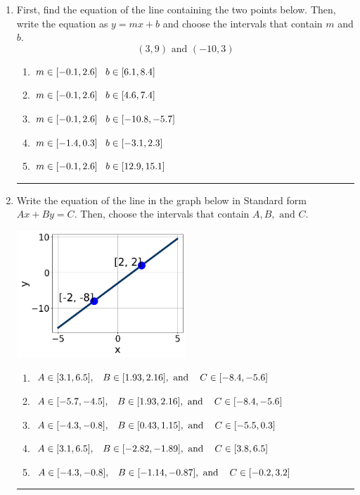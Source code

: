 \documentclass[14pt]{extbook}
\newcommand{\litem}[1]{\item#1\hspace*{-1cm}\rule{\textwidth}{0.4pt}}
\begin{document}
\begin{enumerate}
{\begin{enumerate}[label=\Alph*.]
\end{enumerate} }
\litem{
First, find the equation of the line containing the two points below. Then, write the equation as $ y=mx+b $ and choose the intervals that contain $m$ and $b$.\[ (3, 9) \text{ and } (-10, 3) \]\begin{enumerate}[label=\Alph*.]
\item \( m \in [-0.1, 2.6] \hspace*{3mm} b \in [6.1, 8.4] \)
\item \( m \in [-0.1, 2.6] \hspace*{3mm} b \in [4.6, 7.4] \)
\item \( m \in [-0.1, 2.6] \hspace*{3mm} b \in [-10.8, -5.7] \)
\item \( m \in [-1.4, 0.3] \hspace*{3mm} b \in [-3.1, 2.3] \)
\item \( m \in [-0.1, 2.6] \hspace*{3mm} b \in [12.9, 15.1] \)

\end{enumerate} }
\litem{
Write the equation of the line in the graph below in Standard form $Ax+By=C$. Then, choose the intervals that contain $A, B, \text{ and } C$.
\begin{center}
    \includegraphics[width=0.5\textwidth]{../Figures/linearGraphToStandardCopyA.png}
\end{center}
\begin{enumerate}[label=\Alph*.]
\item \( A \in [3.1, 6.5], \hspace{3mm} B \in [1.93, 2.16], \text{ and } \hspace{3mm} C \in [-8.4, -5.6] \)
\item \( A \in [-5.7, -4.5], \hspace{3mm} B \in [1.93, 2.16], \text{ and } \hspace{3mm} C \in [-8.4, -5.6] \)
\item \( A \in [-4.3, -0.8], \hspace{3mm} B \in [0.43, 1.15], \text{ and } \hspace{3mm} C \in [-5.5, 0.3] \)
\item \( A \in [3.1, 6.5], \hspace{3mm} B \in [-2.82, -1.89], \text{ and } \hspace{3mm} C \in [3.8, 6.5] \)
\item \( A \in [-4.3, -0.8], \hspace{3mm} B \in [-1.14, -0.87], \text{ and } \hspace{3mm} C \in [-0.2, 3.2] \)


\end{enumerate}}
\end{enumerate}
\end{document}
